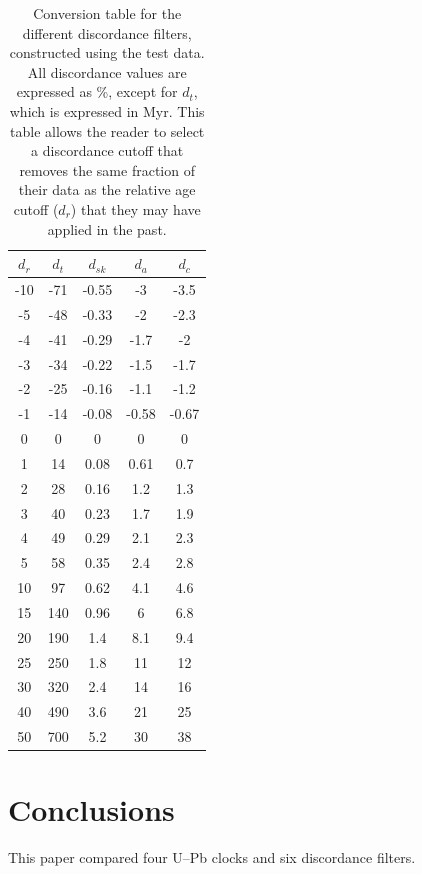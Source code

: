 \documentclass{article}
\begin{document}
\begin{table}
  \begin{tabular}{c|cccc}
    $d_r$ & $d_t$ & $d_{sk}$ & $d_a$ & $d_c$ \\ \hline
    -10 & -71 & -0.55 & -3 & -3.5 \\ 
    -5 & -48 & -0.33 & -2 & -2.3 \\ 
    -4 & -41 & -0.29 & -1.7 & -2 \\ 
    -3 & -34 & -0.22 & -1.5 & -1.7 \\ 
    -2 & -25 & -0.16 & -1.1 & -1.2 \\ 
    -1 & -14 & -0.08 & -0.58 & -0.67 \\ 
    0 & 0 & 0 & 0 & 0 \\ 
    1 & 14 & 0.08 & 0.61 & 0.7 \\ 
    2 & 28 & 0.16 & 1.2 & 1.3 \\ 
    3 & 40 & 0.23 & 1.7 & 1.9 \\ 
    4 & 49 & 0.29 & 2.1 & 2.3 \\ 
    5 & 58 & 0.35 & 2.4 & 2.8 \\ 
    10 & 97 & 0.62 & 4.1 & 4.6 \\ 
    15 & 140 & 0.96 & 6 & 6.8 \\ 
    20 & 190 & 1.4 & 8.1 & 9.4 \\ 
    25 & 250 & 1.8 & 11 & 12 \\ 
    30 & 320 & 2.4 & 14 & 16 \\ 
    40 & 490 & 3.6 & 21 & 25 \\ 
    50 & 700 & 5.2 & 30 & 38 \\ 
  \end{tabular}
  \caption{Conversion table for the different discordance filters,
    constructed using the test data. All discordance values are
    expressed as \%, except for $d_t$, which is expressed in Myr. This
    table allows the reader to select a discordance cutoff that
    removes the same fraction of their data as the relative age cutoff
    ($d_r$) that they may have applied in the past. }
  \label{tab:conversiontable}
\end{table}

\section{Conclusions}
\label{sec:conclusions}

This paper compared four U--Pb clocks and six discordance filters.
\end{document}
